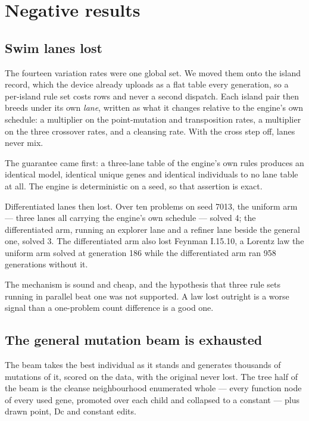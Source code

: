 \documentclass[11pt,a4paper]{article}
\begin{document}
\section{Negative results}
\label{sec:negative}

\subsection{Swim lanes lost}

The fourteen variation rates were one global set. We moved them onto the island
record, which the device already uploads as a flat table every generation, so a
per-island rule set costs rows and never a second dispatch. Each island pair then
breeds under its own \emph{lane}, written as what it changes relative to the
engine's own schedule: a multiplier on the point-mutation and transposition
rates, a multiplier on the three crossover rates, and a cleansing rate. With the
cross step off, lanes never mix.

The guarantee came first: a three-lane table of the engine's own rules produces
an identical model, identical unique genes and identical individuals to no lane
table at all. The engine is deterministic on a seed, so that assertion is exact.

Differentiated lanes then lost. Over ten problems on seed 7013, the uniform arm
--- three lanes all carrying the engine's own schedule --- solved 4; the
differentiated arm, running an explorer lane and a refiner lane beside the
general one, solved 3. The differentiated arm also lost Feynman I.15.10, a
Lorentz law the uniform arm solved at generation 186 while the differentiated
arm ran 958 generations without it.

The mechanism is sound and cheap, and the hypothesis that three rule sets
running in parallel beat one was not supported. A law lost outright is a worse
signal than a one-problem count difference is a good one.

\subsection{The general mutation beam is exhausted}
\label{sec:beam}

The beam takes the best individual as it stands and generates thousands of
mutations of it, scored on the data, with the original never lost. The tree half
of the beam is the cleanse neighbourhood enumerated whole --- every function node
of every used gene, promoted over each child and collapsed to a constant --- plus
drawn point, Dc and constant edits.
\end{document}
